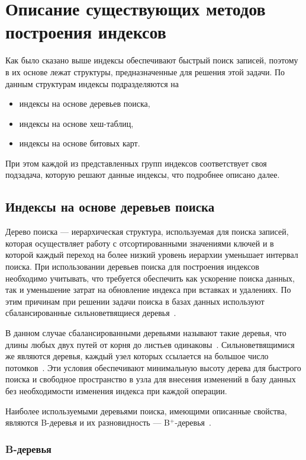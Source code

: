 \chapter{Описание существующих методов построения индексов\label{methods}}

Как было сказано выше индексы обеспечивают быстрый поиск записей, поэтому в их
основе лежат структуры, предназначенные для решения этой задачи. По данным
структурам индексы подразделяются на
\begin{itemize}
    \item индексы на основе деревьев поиска,
    \item индексы на основе хеш-таблиц,
    \item индексы на основе битовых карт.
\end{itemize}

При этом каждой из представленных групп индексов соответствует своя подзадача,
которую решают данные индексы, что подробнее описано далее.

\section{Индексы на основе деревьев поиска}

Дерево поиска --- иерархическая структура, используемая для поиска
записей, которая осуществляет работу с отсортированными значениями ключей и в
которой каждый переход на более низкий уровень иерархии уменьшает интервал
поиска. При использовании деревьев поиска для построения индексов необходимо
учитывать, что требуется обеспечить как ускорение поиска данных, так и
уменьшение затрат на обновление индекса при вставках и удалениях. По этим
причинам при решении задачи поиска в базах данных используют сбалансированные
сильноветвящиеся деревья~\cite{arki}.

В данном случае сбалансированными деревьями называют такие деревья, что
длины любых двух путей от корня до листьев одинаковы~\cite{encycl}.
Сильноветвящимися же являются деревья, каждый узел которых ссылается на
большое число потомков~\cite{squares}.  Эти условия обеспечивают минимальную
высоту дерева для быстрого поиска и свободное пространство в узла для внесения
изменений в базу данных без необходимости изменения индекса при каждой операции.

Наиболее используемыми деревьями поиска, имеющими описанные свойства, являются
B-деревья и их разновидность --- B$^+$-деревья~\cite{arki}.

\subsection{B-деревья}

